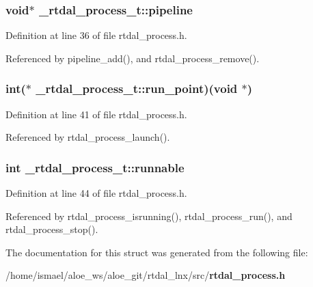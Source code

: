 \subsubsection[{pipeline}]{\setlength{\rightskip}{0pt plus 5cm}void$\ast$ \-\_\-rtdal\-\_\-process\-\_\-t\-::pipeline}\label{struct__rtdal__process__t_a9ec4e6cea3e83c2d3f6b575545975b30}


Definition at line 36 of file rtdal\-\_\-process.\-h.



Referenced by pipeline\-\_\-add(), and rtdal\-\_\-process\-\_\-remove().

\subsubsection[{run\-\_\-point}]{\setlength{\rightskip}{0pt plus 5cm}int($\ast$ \-\_\-rtdal\-\_\-process\-\_\-t\-::run\-\_\-point)(void $\ast$)}\label{struct__rtdal__process__t_a95c19062dd6dc2a8b5d03adc03fa97df}


Definition at line 41 of file rtdal\-\_\-process.\-h.



Referenced by rtdal\-\_\-process\-\_\-launch().

\subsubsection[{runnable}]{\setlength{\rightskip}{0pt plus 5cm}int \-\_\-rtdal\-\_\-process\-\_\-t\-::runnable}\label{struct__rtdal__process__t_a1fca7ce8ac2083e4a97e0e855f25de62}


Definition at line 44 of file rtdal\-\_\-process.\-h.



Referenced by rtdal\-\_\-process\-\_\-isrunning(), rtdal\-\_\-process\-\_\-run(), and rtdal\-\_\-process\-\_\-stop().



The documentation for this struct was generated from the following file\-:\begin{DoxyCompactItemize}
\item 
/home/ismael/aloe\-\_\-ws/aloe\-\_\-git/rtdal\-\_\-lnx/src/{\bf rtdal\-\_\-process.\-h}\end{DoxyCompactItemize}
